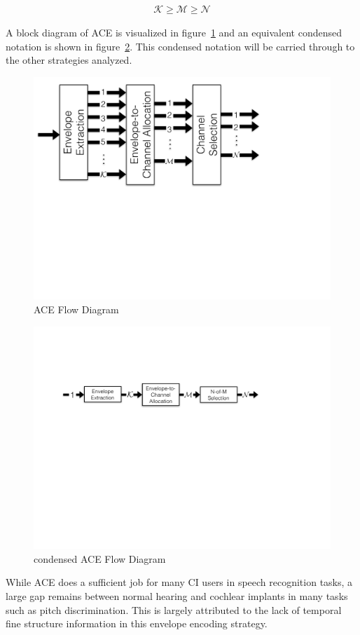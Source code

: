 \documentclass [11pt, proquest,oneside] {ganter_thesis}[2015/03/03]
\begin{document}
\begin{align}
\mathcal{K} \geq \mathcal{M} \geq \mathcal{N} \nonumber
\end{align}

A block diagram of ACE is visualized in figure~\ref{fig:ace_flow_diagram} and an equivalent condensed notation is shown in figure~\ref{fig:ace_flow_diagram_condensed}.  This condensed notation will be carried through to the other strategies analyzed.

\begin{figure}[!ht]
  \centering
    \includegraphics[width=.5\textwidth]{ACE_flow_diagram_explicit}   
    \caption{ACE Flow Diagram}\label{fig:ace_flow_diagram}
\end{figure}

\begin{figure}[!ht]
  \centering
    \includegraphics[width=.7\textwidth]{ACE_flow_diagram}   
    \caption{condensed ACE Flow Diagram}\label{fig:ace_flow_diagram_condensed}
\end{figure}

While ACE does a sufficient job for many CI users in speech recognition tasks, a large gap remains between normal hearing and cochlear implants in many tasks such as pitch discrimination.  This is largely attributed to the lack of temporal fine structure information in this envelope encoding strategy.
\end{document}
